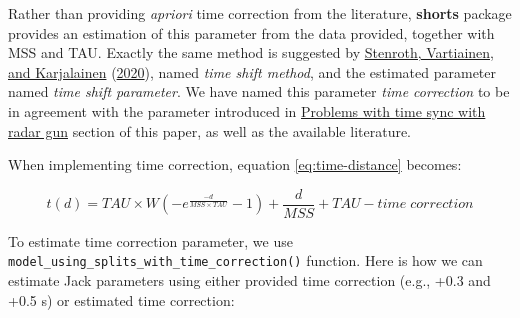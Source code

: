 \documentclass[fleqn,10pt]{wlpeerj} %
\begin{document}
Rather than providing \emph{apriori} time correction from the literature, \textbf{shorts} package provides an estimation of this parameter from the data provided, together with MSS and TAU. Exactly the same method is suggested by \protect\hyperlink{ref-stenrothForcevelocityProfilingIce2020}{Stenroth, Vartiainen, and Karjalainen} (\protect\hyperlink{ref-stenrothForcevelocityProfilingIce2020}{2020}), named \emph{time shift method}, and the estimated parameter named \emph{time shift parameter}. We have named this parameter \emph{time correction} to be in agreement with the parameter introduced in \protect\hyperlink{problems-with-time-sync-with-radar-gun}{Problems with time sync with radar gun} section of this paper, as well as the available literature.

When implementing time correction, equation \eqref{eq:time-distance} becomes:

\begin{equation}
  t(d) = TAU \times W(-e^{\frac{-d}{MSS \times TAU}} - 1) + \frac{d}{MSS} + TAU - time \; correction \label{eq:time-correction}
\end{equation}

To estimate time correction parameter, we use \texttt{model\_using\_splits\_with\_time\_correction()} function. Here is how we can estimate Jack parameters using either provided time correction (e.g., +0.3 and +0.5 s) or estimated time correction:

\small
\end{document}
